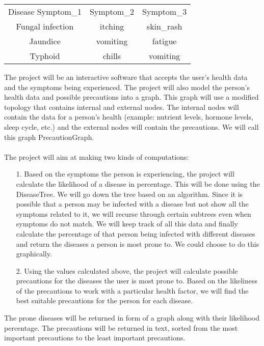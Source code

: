 \documentclass[fontsize=11pt]{article}
\begin{document}
\begin{center}
\begin{tabular}{ |c|c|c| } 
 \hline
Disease	Symptom\_1 & Symptom\_2 & Symptom\_3 \\ 
Fungal infection & itching & skin\_rash \\ 
Jaundice & vomiting & fatigue \\ 
Typhoid	& chills & vomiting \\
 \hline
\end{tabular}
\end{center}

The project will be an interactive software that accepts the user’s health data and the symptoms being experienced. The project will also model the person’s health data and possible precautions into a graph. This graph will use a modified topology that contains internal and external nodes.  The internal nodes will contain the data for a person’s health (example: nutrient levels, hormone levels, sleep cycle, etc.) and the external nodes will contain the precautions. We will call this graph PrecautionGraph. \\
\\
The project will aim at making two kinds of computations:

\begin{enumerate}
\item[1.] Based on the symptoms the person is experiencing, the project will calculate the likelihood of a disease in percentage. This will be done using the DiseaseTree. We will go down the tree based on an algorithm. Since it is possible that a person may be infected with a disease but not show all the symptoms related to it, we will recurse through certain subtrees even when symptoms do not match. We will keep track of all this data and finally calculate the percentage of that person being infected with different diseases and return the diseases a person is most prone to. We could choose to do this graphically.

\item[2.] Using the values calculated above, the project will calculate possible precautions for the diseases the user is most prone to. Based on the likeliness of the precautions to work with a particular health factor, we will find the best suitable precautions for the person for each disease.
\end{enumerate}

The prone diseases will be returned in form of a graph along with their likelihood percentage. The precautions will be returned in text, sorted from the most important precautions to the least important precautions.
\end{document}
